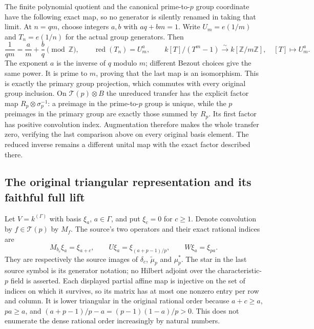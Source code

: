 The finite polynomial quotient and the canonical
prime-to-$p$ group coordinate have the following
exact map, so no generator is silently renamed
in taking that limit. At $n=qm$, choose integers
$a,b$ with $aq+bm=1$. Write $U_m=e(1/m)$ and
$T_n=e(1/n)$ for the actual group generators.
Then
\begin{equation}\tag{CFP31}
 \frac1{qm}=\frac a m+\frac b q\pmod{\mathbb Z},\qquad
 \operatorname{red}(T_n)=U_m^a,\qquad
 k[T]/(T^m-1)\xrightarrow{\sim}k[\mathbb Z/m\mathbb Z],
                         \quad[T]\longmapsto U_m^a.
\end{equation}
The exponent $a$ is the inverse of $q$ modulo $m$;
different Bezout choices give the same power.
It is prime to $m$, proving that the last map
is an isomorphism. This is exactly the primary
group projection, which commutes with every
original group inclusion. On $\mathcal T(p)\otimes B$
the unreduced transfer has the explicit factor map
$R_p\otimes\sigma_p^{-1}$: a preimage in the
prime-to-$p$ group is unique, while the $p$
preimages in the primary group are exactly
those summed by $R_p$. Its first factor has
positive convolution index. Augmentation therefore
makes the whole transfer zero, verifying the
last comparison above on every original basis
element. The reduced inverse remains a different
unital map with the exact factor described there.

\subsection{The original triangular representation and its faithful full lift}

Let $V=k^{(\Gamma)}$ with basis $\xi_a$, $a\in\Gamma$,
and put $\xi_c=0$ for $c\ge1$. Denote convolution by
$f\in\mathcal T(p)$ by $M_f$. The source's two
operators and their exact rational indices are
\begin{equation}\tag{CFP32}
 M_{b_c}\xi_a=\xi_{a+c},\qquad
 U\xi_a=\xi_{(a+p-1)/p},\qquad
 W\xi_a=\xi_{pa}.
\end{equation}
They are respectively the source images of
$\delta_c$, $\widetilde\mu_p$ and $\mu_p^*$.
The star in the last source symbol is its
generator notation; no Hilbert adjoint over
the characteristic-$p$ field is asserted.
Each displayed partial affine map is injective
on the set of indices on which it survives,
so its matrix has at most one nonzero entry
per row and column. It is lower triangular
in the original rational order because
$a+c\ge a$, $pa\ge a$, and
$(a+p-1)/p-a=(p-1)(1-a)/p>0$.
This does not enumerate the dense rational
order increasingly by natural numbers.

